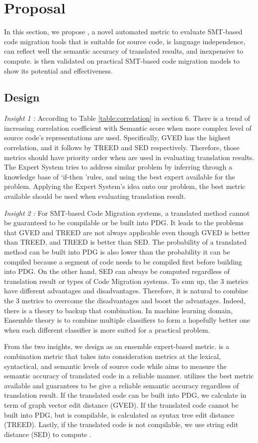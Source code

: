 \section{Proposal}
In this section, we propose {\model}, a novel automated metric to evaluate SMT-based code migration tools that is suitable for source code, is language independence, can reflect well the semantic accuracy of translated results, and inexpensive to compute. {\model} is then validated on practical SMT-based code migration models to show its potential and effectiveness. 

\subsection{Design}
\emph{Insight 1 :} According to Table \ref{table:correlation} in section 6. There is a trend of increasing correlation coefficient with Semantic score when more complex level of source code\rq s representations are used. Specifically, GVED has the highest correlation, and it follows by TREED and SED respectively. Therefore, those metrics should have priority order when are used in evaluating translation results. The Expert System tries to address similar problem by inferring through a knowledge base of \lq if-then \rq rules, and using the best expert available for the problem. Applying the Expert System's idea onto our problem, the best metric available should be used when evaluating translation result.

\emph{Insight 2 :}
For SMT-based Code Migration systems, a translated method cannot be guaranteed to be compilable or be built into PDG. It leads to the problems that GVED and TREED are not always applicable even though GVED is better than TREED, and TREED is better than SED. The probability of a translated method can be built into PDG is also lower than  the probability it can be compiled because a segment of code needs to be compiled first before building into PDG.  On the other hand, SED can always be computed regardless of translation result or types of Code Migration systems. To sum up, the 3 metrics have different advantages and disadvantages. Therefore, it is natural to combine the 3 metrics to overcome the disadvantages and boost the advantages. Indeed, there is a theory to backup that combination. In machine learning domain, Ensemble theory is to combine multiple classifiers to form a hopefully better one when each different classifier is more suited for a practical problem. 

From the two insights, we design {\model} as an ensemble expert-based metric. {\model} is a combination metric that takes into consideration metrics at the lexical, syntactical, and semantic levels of source code while aims to measure the semantic accuracy of translated code in a reliable manner. {\model} utilizes the best metric available and guarantees to be give a reliable semantic accuracy regardless of translation result. If the translated code can be built into PDG, we calculate {\model} in term of graph vector edit distance (GVED). If the translated code cannot be built into PDG, but is compilable, {\model} is calculated as syntax tree edit distance (TREED). Lastly, if the translated code is not compilable, we use string edit distance (SED) to compute {\model}.

